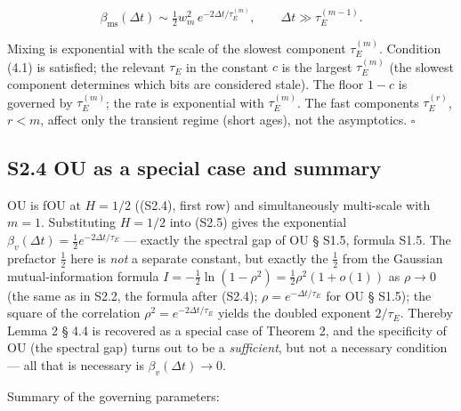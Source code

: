\documentclass[12pt]{iopart}
\begin{document}
\begin{equation}\beta_{\text{ms}}(\Delta t) \sim \tfrac12 w_m^2\,e^{-2\Delta t/\tau_E^{(m)}}, \qquad \Delta t \gg \tau_E^{(m-1)}. \tag{S2.6}\end{equation}



Mixing is exponential with the scale of the slowest component \(\tau_E^{(m)}\). Condition (4.1) is satisfied; the relevant \(\tau_E\) in the constant \(c\) is the largest \(\tau_E^{(m)}\) (the slowest component determines which bits are considered stale). The floor \(1-c\) is governed by \(\tau_E^{(m)}\); the rate is exponential with \(\tau_E^{(m)}\). The fast components \(\tau_E^{(r)}\), \(r < m\), affect only the transient regime (short ages), not the asymptotics. \(\square\)



\subsection{S2.4 OU as a special case and summary}\label{s2.4-ou-as-a-special-case-and-summary}



OU is fOU at \(H = 1/2\) ((S2.4), first row) and simultaneously multi-scale with \(m = 1\). Substituting \(H = 1/2\) into (S2.5) gives the exponential \(\beta_v(\Delta t) = \tfrac12 e^{-2\Delta t/\tau_E}\) --- exactly the spectral gap of OU \cite{Andriishin2026b} § S1.5, formula S1.5. The prefactor \(\tfrac12\) here is \emph{not} a separate constant, but exactly the \(\tfrac12\) from the Gaussian mutual-information formula \(I = -\tfrac12\ln(1-\rho^2) = \tfrac12\rho^2(1+o(1))\) as \(\rho \to 0\) (the same as in S2.2, the formula after (S2.4); \(\rho = e^{-\Delta t/\tau_E}\) for OU \cite{Andriishin2026b} § S1.5); the square of the correlation \(\rho^2 = e^{-2\Delta t/\tau_E}\) yields the doubled exponent \(2/\tau_E\). Thereby Lemma 2 \cite{Andriishin2026b} § 4.4 is recovered as a special case of Theorem 2, and the specificity of OU (the spectral gap) turns out to be a \emph{sufficient}, but not a necessary condition --- all that is necessary is \(\beta_v(\Delta t) \to 0\).



Summary of the governing parameters:
\end{document}

